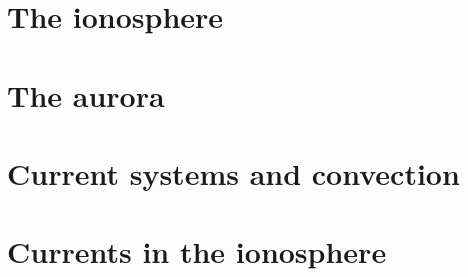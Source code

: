 \documentclass[small_title,unis]{book_class}
\begin{document}
\chapter{The ionosphere}



\chapter{The aurora}



\chapter{Current systems and convection}



\chapter{Currents in the ionosphere}





\end{document}
